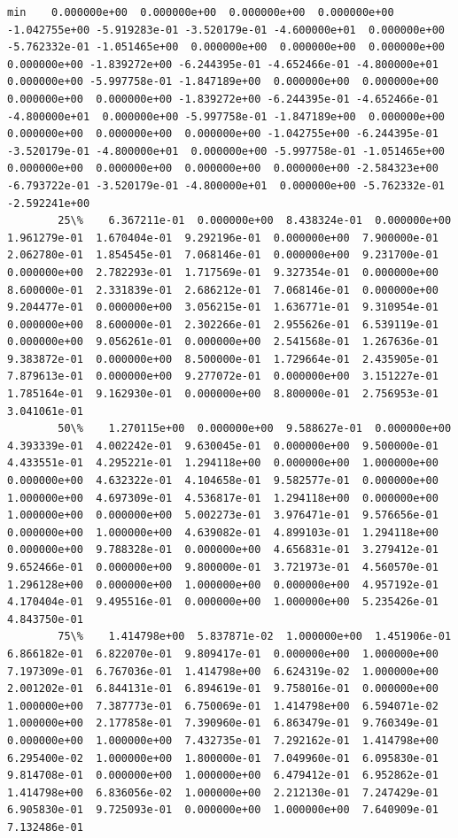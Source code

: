 \documentclass[11pt]{article}
\begin{document}
\begin{Verbatim}[commandchars=\\\{\}]
        min    0.000000e+00  0.000000e+00  0.000000e+00  0.000000e+00 -1.042755e+00 -5.919283e-01 -3.520179e-01 -4.600000e+01  0.000000e+00 -5.762332e-01 -1.051465e+00  0.000000e+00  0.000000e+00  0.000000e+00  0.000000e+00 -1.839272e+00 -6.244395e-01 -4.652466e-01 -4.800000e+01  0.000000e+00 -5.997758e-01 -1.847189e+00  0.000000e+00  0.000000e+00  0.000000e+00  0.000000e+00 -1.839272e+00 -6.244395e-01 -4.652466e-01 -4.800000e+01  0.000000e+00 -5.997758e-01 -1.847189e+00  0.000000e+00  0.000000e+00  0.000000e+00  0.000000e+00 -1.042755e+00 -6.244395e-01 -3.520179e-01 -4.800000e+01  0.000000e+00 -5.997758e-01 -1.051465e+00  0.000000e+00  0.000000e+00  0.000000e+00  0.000000e+00 -2.584323e+00 -6.793722e-01 -3.520179e-01 -4.800000e+01  0.000000e+00 -5.762332e-01 -2.592241e+00
        25\%    6.367211e-01  0.000000e+00  8.438324e-01  0.000000e+00  1.961279e-01  1.670404e-01  9.292196e-01  0.000000e+00  7.900000e-01  2.062780e-01  1.854545e-01  7.068146e-01  0.000000e+00  9.231700e-01  0.000000e+00  2.782293e-01  1.717569e-01  9.327354e-01  0.000000e+00  8.600000e-01  2.331839e-01  2.686212e-01  7.068146e-01  0.000000e+00  9.204477e-01  0.000000e+00  3.056215e-01  1.636771e-01  9.310954e-01  0.000000e+00  8.600000e-01  2.302266e-01  2.955626e-01  6.539119e-01  0.000000e+00  9.056261e-01  0.000000e+00  2.541568e-01  1.267636e-01  9.383872e-01  0.000000e+00  8.500000e-01  1.729664e-01  2.435905e-01  7.879613e-01  0.000000e+00  9.277072e-01  0.000000e+00  3.151227e-01  1.785164e-01  9.162930e-01  0.000000e+00  8.800000e-01  2.756953e-01  3.041061e-01
        50\%    1.270115e+00  0.000000e+00  9.588627e-01  0.000000e+00  4.393339e-01  4.002242e-01  9.630045e-01  0.000000e+00  9.500000e-01  4.433551e-01  4.295221e-01  1.294118e+00  0.000000e+00  1.000000e+00  0.000000e+00  4.632322e-01  4.104658e-01  9.582577e-01  0.000000e+00  1.000000e+00  4.697309e-01  4.536817e-01  1.294118e+00  0.000000e+00  1.000000e+00  0.000000e+00  5.002273e-01  3.976471e-01  9.576656e-01  0.000000e+00  1.000000e+00  4.639082e-01  4.899103e-01  1.294118e+00  0.000000e+00  9.788328e-01  0.000000e+00  4.656831e-01  3.279412e-01  9.652466e-01  0.000000e+00  9.800000e-01  3.721973e-01  4.560570e-01  1.296128e+00  0.000000e+00  1.000000e+00  0.000000e+00  4.957192e-01  4.170404e-01  9.495516e-01  0.000000e+00  1.000000e+00  5.235426e-01  4.843750e-01
        75\%    1.414798e+00  5.837871e-02  1.000000e+00  1.451906e-01  6.866182e-01  6.822070e-01  9.809417e-01  0.000000e+00  1.000000e+00  7.197309e-01  6.767036e-01  1.414798e+00  6.624319e-02  1.000000e+00  2.001202e-01  6.844131e-01  6.894619e-01  9.758016e-01  0.000000e+00  1.000000e+00  7.387773e-01  6.750069e-01  1.414798e+00  6.594071e-02  1.000000e+00  2.177858e-01  7.390960e-01  6.863479e-01  9.760349e-01  0.000000e+00  1.000000e+00  7.432735e-01  7.292162e-01  1.414798e+00  6.295400e-02  1.000000e+00  1.800000e-01  7.049960e-01  6.095830e-01  9.814708e-01  0.000000e+00  1.000000e+00  6.479412e-01  6.952862e-01  1.414798e+00  6.836056e-02  1.000000e+00  2.212130e-01  7.247429e-01  6.905830e-01  9.725093e-01  0.000000e+00  1.000000e+00  7.640909e-01  7.132486e-01

\end{Verbatim}
\end{document}
